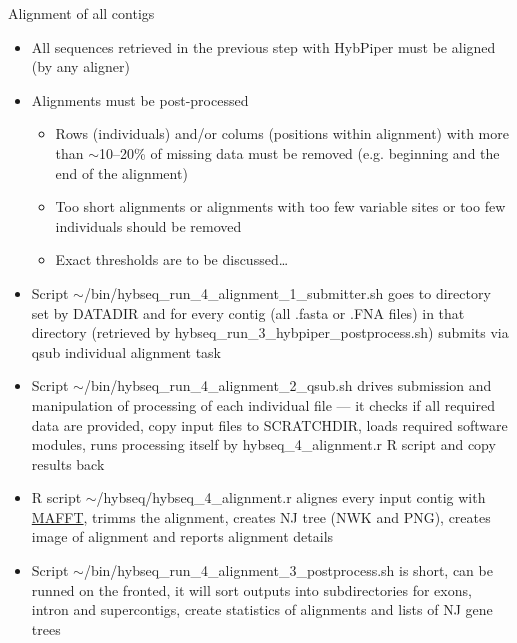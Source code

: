 \documentclass[compress, ucs, xelatex, 11pt, xcolor=x11names, aspectratio=169,
	hyperref={
		bookmarks=true,
		unicode=true,
		colorlinks=true,
		pdftitle={HybSeq course},
		plainpages=false,
		pdfauthor={Vojtech Zeisek},
		pdfsubject={Practical processing of HybSeq target enrichment sequencing data on computing grids like MetaCentrum},
		pdfcreator={XeLaTeX},
		pdfkeywords={BASH, command line, GNU, HybSeq, Linux, MetaCentrum, sequencing shell, target enrichment},
		linkcolor=Cyan2, %
		anchorcolor=Firebrick2, %
		citecolor=Firebrick2, %
		filecolor=Firebrick2, %
		menucolor=Firebrick2, %
		urlcolor=Chartreuse2, %
		pdftex},
	url={hyphens, lowtilde} %
	]{beamer}
\renewcommand{\texttt}[1]{\colorbox{Snow4}{{\ttfamily #1}}}
\begin{document}
\begin{frame}[allowframebreaks]{Alignment of all contigs}
	\begin{itemize}
		\item All sequences retrieved in the previous step with HybPiper must be aligned (by any aligner)
		\item Alignments must be post-processed
		\begin{itemize}
			\item Rows (individuals) and/or colums (positions within alignment) with more than $\sim$10--20\% of missing data must be removed (e.g. beginning and the end of the alignment)
			\item Too short alignments or alignments with too few variable sites or too few individuals should be removed
			\item Exact thresholds are to be discussed\ldots
		\end{itemize}
		\item Script \texttt{$\sim$/bin/hybseq\_run\_4\_alignment\_1\_submitter.sh} goes to directory set by \texttt{DATADIR} and for every contig (all \texttt{*.fasta} or \texttt{*.FNA} files) in that directory (retrieved by \texttt{hybseq\_run\_3\_hybpiper\_postprocess.sh}) submits via \texttt{qsub} individual alignment task
		\item Script \texttt{$\sim$/bin/hybseq\_run\_4\_alignment\_2\_qsub.sh} drives submission and manipulation of processing of each individual file --- it checks if all required data are provided, copy input files to \texttt{SCRATCHDIR}, loads required software modules, runs processing itself by \texttt{hybseq\_4\_alignment.r} \texttt{R} script and copy results back
		\item \texttt{R} script \texttt{$\sim$/hybseq/hybseq\_4\_alignment.r} alignes every input contig with \href{https://mafft.cbrc.jp/alignment/software/}{MAFFT}, trimms the alignment, creates NJ tree (NWK and PNG), creates image of alignment and reports alignment details
		\item Script \texttt{$\sim$/bin/hybseq\_run\_4\_alignment\_3\_postprocess.sh} is short, can be runned on the fronted, it will sort outputs into subdirectories for exons, intron and supercontigs, create statistics of alignments and lists of NJ gene trees
	\end{itemize}
\end{frame}
\end{document}
